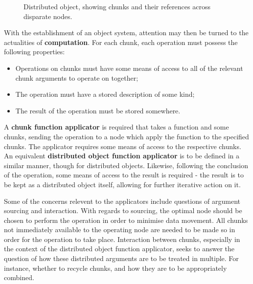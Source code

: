 \documentclass[letterpaper, inpress]{jds} %
\begin{document}
\begin{figure}[ht]
\begin{center}
    
\caption{Distributed object, showing chunks and their references across disparate nodes.}
\label{fig:distobj}
\end{center}
\end{figure}

With the establishment of an object system, attention may then be turned to the actualities of \textbf{computation}. 
For each chunk, each operation must possess the following properties:

\begin{itemize}
    \item Operations on chunks must have some means of access to all of the relevant chunk arguments to operate on together;
    \item The operation must have a stored description of some kind;
    \item The result of the operation must be stored somewhere.
\end{itemize}

A \textbf{chunk function applicator} is required that takes a function and some chunks, sending the operation to a node which apply the function to the specified chunks.
The applicator requires some means of access to the respective chunks.
An equivalent \textbf{distributed object function applicator} is to be defined in a similar manner, though for distributed objects.
Likewise, following the conclusion of the operation, some means of access to the result is required - the result is to be kept as a distributed object itself, allowing for further iterative action on it.

Some of the concerns relevent to the applicators include questions of argument sourcing and interaction.
With regards to sourcing, the optimal node should be chosen to perform the operation in order to minimise data movement.
All chunks not immediately available to the operating node are needed to be made so in order for the operation to take place.
Interaction between chunks, especially in the context of the distributed object function applicator, seeks to answer the question of how these distributed arguments are to be treated in multiple.
For instance, whether to recycle chunks, and how they are to be appropriately combined.
\end{document}
